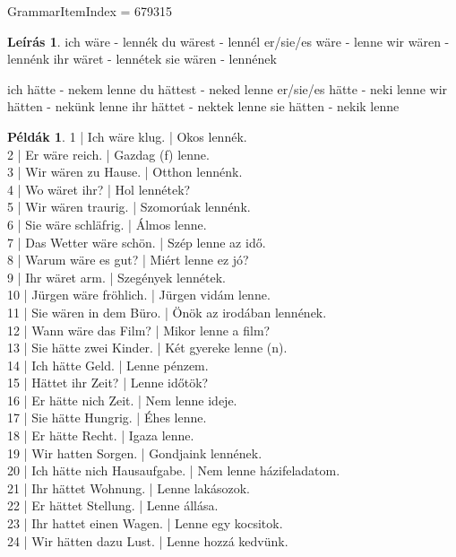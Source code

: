 \documentclass{article}
\theoremstyle{definition}
\newtheorem*{exmp}{Példák}
\newtheorem*{desc}{Leírás}
\begin{document}
GrammarItemIndex = 679315

\begin{desc}
ich wäre - lennék
du wärest - lennél
er/sie/es wäre - lenne
wir wären - lennénk
ihr wäret - lennétek
sie wären - lennének

ich hätte - nekem lenne
du hättest - neked lenne
er/sie/es hätte - neki lenne
wir hätten - nekünk lenne
ihr hättet - nektek lenne
sie hätten - nekik lenne
\end{desc}

\begin{exmp}
1 | Ich wäre klug. | Okos lennék.\\
2 | Er wäre reich. | Gazdag (f) lenne.\\
3 | Wir wären zu Hause. | Otthon lennénk.\\
4 | Wo wäret ihr? | Hol lennétek?\\
5 | Wir wären traurig. | Szomorúak lennénk.\\
6 | Sie wäre schläfrig. | Álmos lenne.\\
7 | Das Wetter wäre schön. | Szép lenne az idő.\\
8 | Warum wäre es gut? | Miért lenne ez jó?\\
9 | Ihr wäret arm. | Szegények lennétek.\\
10 | Jürgen wäre fröhlich. | Jürgen vidám lenne.\\
11 | Sie wären in dem Büro. | Önök az irodában lennének.\\
12 | Wann wäre das Film? | Mikor lenne a film?\\
13 | Sie hätte zwei Kinder. | Két gyereke lenne (n).\\
14 | Ich hätte Geld. | Lenne pénzem.\\
15 | Hättet ihr Zeit? | Lenne időtök?\\
16 | Er hätte nich Zeit. | Nem lenne ideje.\\
17 | Sie hätte Hungrig. | Éhes lenne.\\
18 | Er hätte Recht. | Igaza lenne.\\
19 | Wir hatten Sorgen. | Gondjaink lennének.\\
20 | Ich hätte nich Hausaufgabe. | Nem lenne házifeladatom.\\
21 | Ihr hättet Wohnung. | Lenne lakásozok.\\
22 | Er hättet Stellung. | Lenne állása.\\
23 | Ihr hattet einen Wagen. | Lenne egy kocsitok.\\
24 | Wir hätten dazu Lust. | Lenne hozzá kedvünk.\\
\end{exmp}
\end{document}
